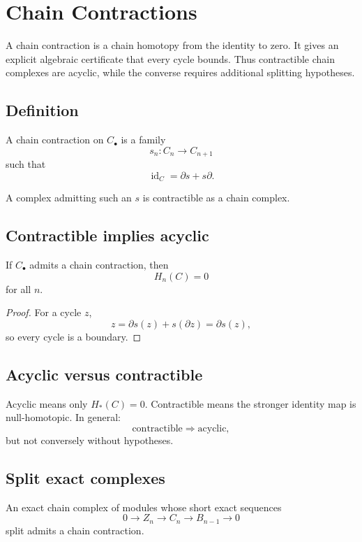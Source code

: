 ﻿\chapter{Chain Contractions}
\label{ch:viii23-chain-contractions}

A chain contraction is a chain homotopy from the identity to zero.  It gives an
explicit algebraic certificate that every cycle bounds.  Thus contractible
chain complexes are acyclic, while the converse requires additional splitting
hypotheses.

\section{Definition}
\begin{definition}
\label{def:viii23-contraction}
A chain contraction on \(C_\bullet\) is a family
\[
s_n:C_n\to C_{n+1}
\]
such that
\[
\operatorname{id}_C=\partial s+s\partial.
\]
\end{definition}

A complex admitting such an \(s\) is contractible as a chain complex.

\section{Contractible implies acyclic}
\begin{theorem}
\label{thm:viii23-acyclic}
If \(C_\bullet\) admits a chain contraction, then
\[
H_n(C)=0
\]
for all \(n\).
\end{theorem}

\begin{proof}
For a cycle \(z\),
\[
z=\partial s(z)+s(\partial z)=\partial s(z),
\]
so every cycle is a boundary.
\end{proof}

\section{Acyclic versus contractible}
Acyclic means only \(H_*(C)=0\).  Contractible means the stronger identity map
is null-homotopic.  In general:
\[
\text{contractible}\Longrightarrow\text{acyclic},
\]
but not conversely without hypotheses.

\section{Split exact complexes}
\begin{theorem}
\label{thm:viii23-split}
An exact chain complex of modules whose short exact sequences
\[
0\to Z_n\to C_n\to B_{n-1}\to0
\]
split admits a chain contraction.
\end{theorem}

